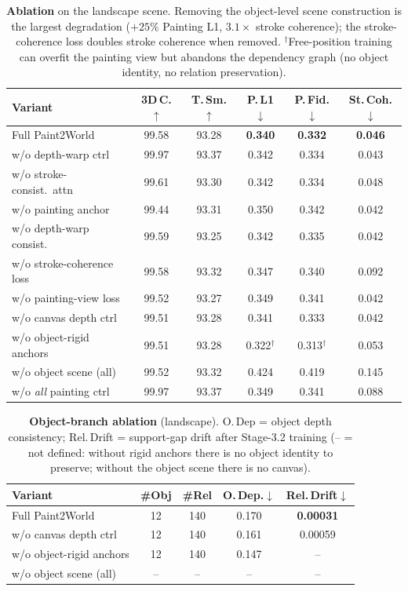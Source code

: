 \begin{table}[t]
\centering
\scriptsize
\setlength{\tabcolsep}{3pt}
\begin{tabular*}{\linewidth}{@{\extracolsep{\fill}}lccccc}
\toprule
Variant & 3D\,C.$\uparrow$ & T.\,Sm.$\uparrow$ & P.\,L1$\downarrow$ & P.\,Fid.$\downarrow$ & St.\,Coh.$\downarrow$ \\
\midrule
Full Paint2World & 99.58 & 93.28 & \textbf{0.340} & \textbf{0.332} & \textbf{0.046} \\
\midrule
w/o depth-warp ctrl & 99.97 & 93.37 & 0.342 & 0.334 & 0.043 \\
w/o stroke-consist.\ attn & 99.61 & 93.30 & 0.342 & 0.334 & 0.048 \\
w/o painting anchor & 99.44 & 93.31 & 0.350 & 0.342 & 0.042 \\
w/o depth-warp consist. & 99.59 & 93.25 & 0.342 & 0.335 & 0.042 \\
w/o stroke-coherence loss & 99.58 & 93.32 & 0.347 & 0.340 & 0.092 \\
w/o painting-view loss & 99.52 & 93.27 & 0.349 & 0.341 & 0.042 \\
w/o canvas depth ctrl & 99.51 & 93.28 & 0.341 & 0.333 & 0.042 \\
w/o object-rigid anchors & 99.51 & 93.28 & 0.322$^\dagger$ & 0.313$^\dagger$ & 0.053 \\
\midrule
w/o object scene (all) & 99.52 & 93.32 & 0.424 & 0.419 & 0.145 \\
w/o \emph{all} painting ctrl & 99.97 & 93.37 & 0.349 & 0.341 & 0.088 \\
\bottomrule
\end{tabular*}
\caption{\textbf{Ablation} on the landscape scene. Removing the object-level
scene construction is the largest degradation ($+25\%$ Painting L1,
$3.1\times$ stroke coherence); the stroke-coherence loss doubles stroke
coherence when removed. $^\dagger$Free-position training can overfit the
painting view but abandons the dependency graph (no object identity, no
relation preservation).}
\label{tab:ablation}
\end{table}

\begin{table}[t]
\centering
\scriptsize
\setlength{\tabcolsep}{3pt}
\begin{tabular*}{\linewidth}{@{\extracolsep{\fill}}lcccc}
\toprule
Variant & \#Obj & \#Rel & O.\,Dep.$\downarrow$ & Rel.\,Drift$\downarrow$ \\
\midrule
Full Paint2World & 12 & 140 & 0.170 & \textbf{0.00031} \\
w/o canvas depth ctrl & 12 & 140 & 0.161 & 0.00059 \\
w/o object-rigid anchors & 12 & 140 & 0.147 & -- \\
w/o object scene (all) & -- & -- & -- & -- \\
\bottomrule
\end{tabular*}
\caption{\textbf{Object-branch ablation} (landscape). O.\,Dep = object
depth consistency; Rel.\,Drift = support-gap drift after Stage-3.2 training
(-- = not defined: without rigid anchors there is no object identity to
preserve; without the object scene there is no canvas).}
\label{tab:ablation-object}
\end{table}

